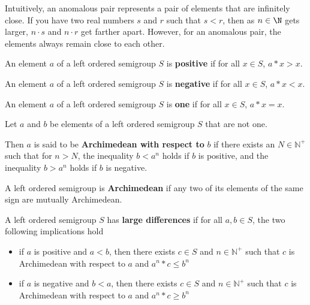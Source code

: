 Intuitively, an anomalous pair represents a pair
of elements that are infinitely close.
If you have two real numbers $s$ and $r$ such that $s < r$,
then as $n \in \N$ gets larger, $n\cdot s$ and $n\cdot r$
get farther apart. However, for an anomalous pair,
the elements always remain close to each other.

\begin{definition}\label{def:positive}\leanok
{}
An element $a$ of a left ordered semigroup $S$ is \textbf{positive} if for all $x\in S$, $a*x > x$.
\end{definition}

\begin{definition}\label{def:negative}\leanok
{}
An element $a$ of a left ordered semigroup $S$
is \textbf{negative} if for all $x\in S$, $a*x < x$.
\end{definition}

\begin{definition}\label{def:one}\leanok
{}
An element $a$ of a left ordered semigroup $S$
is \textbf{one} if for all $x\in S$, $a*x = x$.
\end{definition}

\begin{definition}\label{def:arch_wrt}\leanok
{}
Let $a$ and $b$ be elements of a left ordered semigroup $S$ that are not one.

Then $a$ is said to be \textbf{Archimedean with respect to} $b$
if there exists an $N\in \mathbb{N}^+$ such that for $n > N$,
the inequality $b < a^n$ holds if $b$ is positive,
and the inequality $b > a^n$ holds if $b$ is negative.
\end{definition}

\begin{definition}\label{def:arch}\leanok
{}
A left ordered semigroup is \textbf{Archimedean} if any two of its elements
of the same sign are mutually Archimedean.
\end{definition}

\begin{definition}\label{def:has_large_differences}\leanok
A left ordered semigroup $S$ has \textbf{large differences} if
for all $a,b\in S$, the two following implications hold
\begin{itemize}
\item if $a$ is positive and $a<b$, then there exists $c\in S$
and $n\in \mathbb{N}^+$ such that $c$ is Archimedean with respect to $a$
and $a^n*c \le b^n$
\item if $a$ is negative and $b < a$, then there exists $c\in S$
and $n\in \mathbb{N}^+$ such that $c$ is Archimedean with respect to $a$
and $a^n*c \ge b^n$
\end{itemize}
\end{definition}

